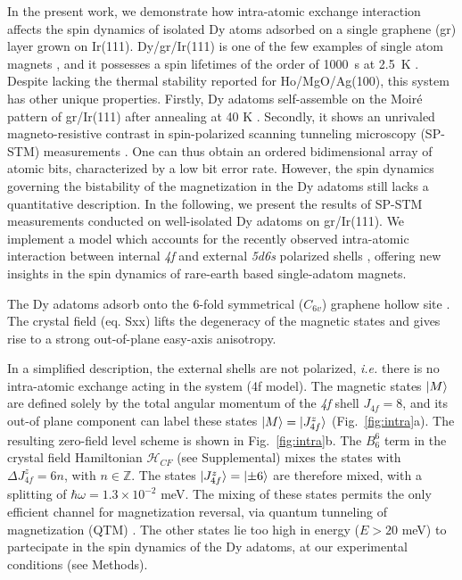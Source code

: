 \documentclass[
reprint,amsmath,amssymb,aps]{revtex4-2}
\begin{document}
In the present work, we demonstrate how intra-atomic exchange interaction affects the spin dynamics of isolated Dy atoms adsorbed on a single graphene (gr) layer grown on Ir(111). Dy/gr/Ir(111) is one of the few examples of single atom magnets \cite{Natterer2018,kiralyOrbitallyDerivedSingleatom2018}, and it possesses a spin lifetimes of the order of 1000~s at 2.5~K \cite{baltic2016}. Despite lacking the thermal stability reported for Ho/MgO/Ag(100), this system has other unique properties. Firstly, Dy adatoms self-assemble on the Moiré pattern of gr/Ir(111) after annealing at 40 K \cite{pivettaDirectCaptureElectrostatic2018}. Secondly, it shows an unrivaled magneto-resistive contrast in spin-polarized scanning tunneling microscopy (SP-STM) measurements \cite{pivettaMeasuringIntraAtomicExchange2020}. One can thus obtain an ordered bidimensional array of atomic bits, characterized by a low bit error rate.
However, the spin dynamics governing the bistability of the magnetization in the Dy adatoms still lacks a quantitative  description.
In the following, we present the results of SP-STM  measurements conducted  on  well-isolated  Dy  adatoms on gr/Ir(111). We implement a model which accounts for the  recently  observed  intra-atomic  interaction  between internal \textit{4f} and  external \textit{5d6s} polarized  shells  \cite{pivettaMeasuringIntraAtomicExchange2020}, offering new insights in the spin dynamics  of  rare-earth  based  single-adatom  magnets.

The Dy adatoms adsorb onto the 6-fold symmetrical ($C_{6v}$) graphene hollow site \cite{baltic2018}. The crystal field (eq. Sxx) lifts the degeneracy of the magnetic states and gives rise to a strong out-of-plane easy-axis anisotropy.

In a simplified description, the external shells are not polarized, \textit{i.e.} there is no intra-atomic exchange acting in the system (4f model).
The magnetic states $\ket{M}$ are defined solely by the total angular momentum of the \textit{4f} shell $J_{4f}=8$, and its out-of plane component can label these states $\ket{M}=\ket{J^{z}_{4f}}$ (Fig.~\ref{fig:intra}a). The resulting zero-field level scheme is shown in Fig.~\ref{fig:intra}b. The $B_6^6$ term in the crystal field Hamiltonian  $\mathcal{H}_{CF}$ (see Supplemental) mixes the states with $\Delta J^{z}_{4f}=6n$, with $n\in \mathbb{Z}$. The states $\ket{J^{z}_{4f}}=\ket{\pm 6}$ are therefore mixed, with a splitting of $\hbar\omega=1.3 \times 10^{-2}$ meV. The mixing of these states permits the only efficient channel for magnetization reversal, via quantum tunneling of magnetization (QTM) \citep{baltic2016}. The other states lie too high in energy ($E>20$ meV) to partecipate in the spin dynamics of the Dy adatoms, at our experimental conditions (see Methods).
\end{document}
